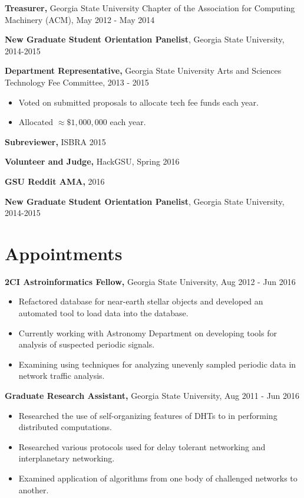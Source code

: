 \documentclass{res}
\begin{document}
\begin{resume}
{\bf Treasurer,} Georgia State University Chapter of the Association for Computing Machinery (ACM), May 2012 - May 2014

{\bf New Graduate Student Orientation Panelist}, Georgia State University, 2014-2015


{\bf Department Representative,} Georgia State University Arts and Sciences Technology Fee Committee, 2013 - 2015
\begin{itemize}
	\item Voted on submitted proposals to allocate tech fee funds each year.
	\item Allocated $\approx \$1,000,000$ each year.
\end{itemize}

{\bf Subreviewer,} ISBRA 2015

{\bf Volunteer and Judge,} HackGSU, Spring 2016

{\bf GSU Reddit AMA,} 2016



{\bf New Graduate Student Orientation Panelist}, Georgia State University, 2014-2015



\section{Appointments}

{\bf 2CI Astroinformatics Fellow,} Georgia State University, Aug 2012 - Jun 2016
     \begin{itemize}
     \item Refactored database for near-earth stellar objects and developed an automated tool to load data into the database.
     \item Currently working with Astronomy Department on developing tools for analysis of suspected periodic signals.
     \item Examining using techniques for analyzing unevenly sampled periodic data in network traffic analysis.
     \end{itemize}   


{\bf Graduate Research Assistant,} Georgia State University, Aug 2011 - Jun 2016
     \begin{itemize}
     \item Researched the use of self-organizing features of DHTs to in performing distributed computations.
     \item Researched various protocols used for delay tolerant networking and interplanetary networking.
     \item Examined application of algorithms from one body of challenged networks to another.
  

\end{itemize}
\end{resume}
\end{document}

